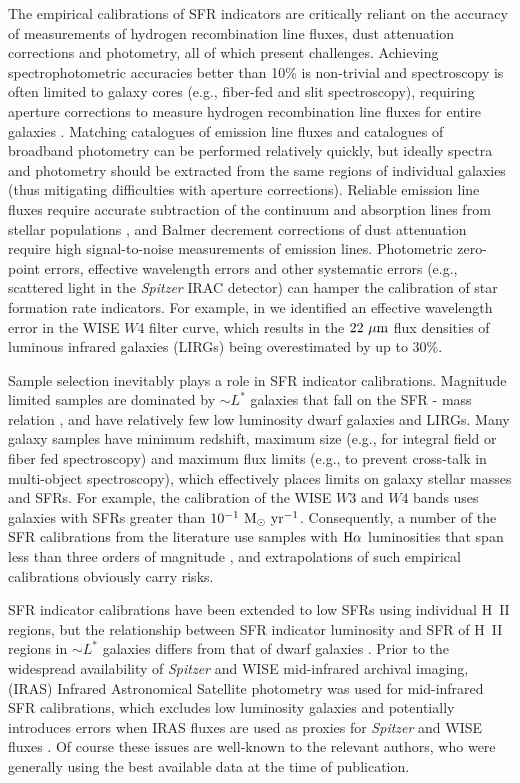 \documentclass[preprint]{aastex61}
\begin{document}
The empirical calibrations of SFR indicators are critically reliant on the accuracy of measurements of hydrogen recombination line fluxes, dust attenuation corrections and photometry, all of which present challenges. Achieving spectrophotometric accuracies better than 10\% is non-trivial and spectroscopy is often limited to galaxy cores (e.g., fiber-fed and slit spectroscopy), requiring aperture corrections to measure hydrogen recombination line fluxes for entire galaxies \citep[e.g.,][]{hop03, brou11}. Matching catalogues of emission line fluxes and catalogues of broadband photometry can be performed relatively quickly, but ideally spectra and photometry should be extracted from the same regions of individual galaxies (thus mitigating difficulties with aperture corrections). Reliable emission line fluxes require accurate subtraction of the continuum and absorption lines from stellar populations \citep[e.g.,][]{tre04,mou06}, and Balmer decrement corrections of dust attenuation require high signal-to-noise measurements of emission lines. Photometric zero-point errors, effective wavelength errors and other systematic errors (e.g., scattered light in the {\it Spitzer} IRAC detector) can hamper the calibration of star formation rate indicators. For example, in \citet{bro14} we identified an effective wavelength error in the WISE $W4$ filter curve, which results in the $22~{\rm \mu m}$ flux densities of luminous infrared galaxies (LIRGs) being overestimated by up to 30\%. 

Sample selection inevitably plays a role in SFR indicator calibrations. Magnitude limited samples are dominated by $\sim L^*$ galaxies that fall on the SFR - mass relation \citep[i.e., the ``star forming main sequence,''][]{noe07}, and have relatively few low luminosity dwarf galaxies and LIRGs. Many galaxy samples have minimum redshift, maximum size (e.g., for integral field or fiber fed spectroscopy) and maximum flux limits (e.g., to prevent cross-talk in multi-object spectroscopy), which effectively places limits on galaxy stellar masses and SFRs. For example, the \citet{clu14} calibration of the WISE $W3$ and $W4$ bands uses galaxies with SFRs greater than $10^{-1}~{\rm M_\odot~yr^{-1}}$. Consequently, a number of the SFR calibrations from the literature use samples with ${\rm H\alpha}$ luminosities that span less than three orders of magnitude \citep{wu05,lee13,clu14,cat15}, and extrapolations of such empirical calibrations obviously carry risks. 

SFR indicator calibrations have been extended to low SFRs using individual H~II regions, but the relationship between SFR indicator luminosity and SFR of H~II regions in $\sim L^*$ galaxies differs from that of dwarf galaxies \citep[e.g.,][]{cal07,rel07,ken09}. Prior to the widespread availability of {\it Spitzer} and WISE mid-infrared archival imaging, (IRAS) Infrared Astronomical Satellite photometry was used for mid-infrared SFR calibrations, which excludes low luminosity galaxies and potentially introduces errors when IRAS fluxes are used as proxies for {\it Spitzer} and WISE fluxes \citep{ken09}. Of course these issues are well-known to the relevant authors, who were generally using the best available data at the time of publication.
\end{document}
